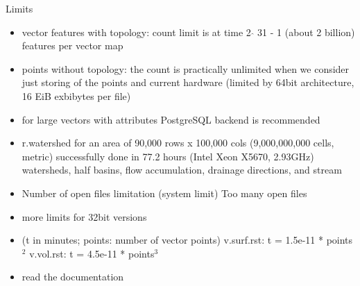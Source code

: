 \documentclass[xcolor={dvipsnames,usenames},beamer,aspectratio=169]{beamer}
\begin{document}
\begin{frame}{Limits}

\begin{itemize}
  \item vector features with topology:
    count limit is at time 2 $\hat{}$ 31 - 1 (about 2 billion) features per vector map
  \item points without topology:
    the count is practically unlimited when we consider just storing of the points and current hardware
      (limited by 64bit architecture, 16 EiB exbibytes per file)
  \item for large vectors with attributes PostgreSQL backend is recommended
  \item r.watershed for an area of 90,000 rows x 100,000 cols (9,000,000,000 cells, metric)
    successfully done in 77.2 hours (Intel Xeon X5670, 2.93GHz)
    watersheds, half basins, flow accumulation, drainage directions, and stream
  \item Number of open files limitation (system limit)
    Too many open files
  \item more limits for 32bit versions
  \item      (t in minutes; points: number of vector points)
    v.surf.rst: t = 1.5e-11 * points$^2$
    v.vol.rst: t = 4.5e-11 * points$^3$
  \item read the documentation
\end{itemize}

\end{frame}
\end{document}
